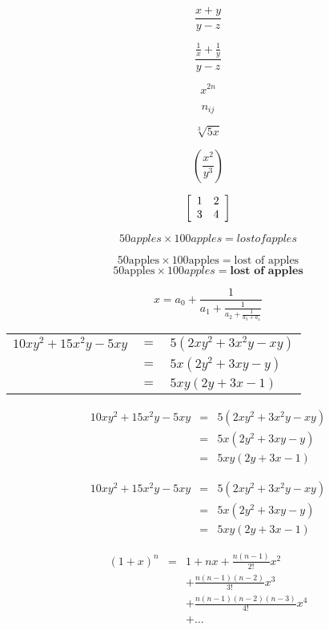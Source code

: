 \documentclass{article}
\begin{document}
 
    $$\frac{x+y}{y-z}$$	

    $$\frac{\frac{1}{x}+\frac{1}{y}}{y-z}$$	

    $$x^{2n}$$

    $$n_{ij}$$

    $$\sqrt[3]{5x}$$

    $$\left(\frac{x^2}{y^3}\right)$$

    $$\left[
    \begin{array}{ c c }
        1 & 2 \\
        3 & 4
    \end{array} 
    \right]$$

    \begin{equation}
        50 apples \times 100 apples = lost of apples
    \end{equation}
    
    \begin{equation}
        50 \mbox{apples} \times 100 \mbox{apples} = \mbox{lost of apples}
    \end{equation}
    \begin{equation}
        50 \textrm{apples} \times 100 \textit{apples} = \textbf{lost of apples}
    \end{equation}
    
    \begin{equation}
        x = a_0 + \frac{1}{\displaystyle a_1 
                + \frac{1}{\displaystyle a_2 
                + \frac{1}{\displaystyle a_3 + a_4}}}
    \end{equation}  
    \begin{tabular}{ r c l }
        \(10xy^2+15x^2y-5xy\) & \(=\) & \(5\left(2xy^2+3x^2y-xy\right)\) \\
        & \(=\) & \(5x\left(2y^2+3xy-y\right)\) \\
        & \(=\) & \(5xy\left(2y+3x-1\right)\)
    \end{tabular}

    \begin{eqnarray}
        10xy^2+15x^2y-5xy & = & 5\left(2xy^2+3x^2y-xy\right) \\
        & = & 5x\left(2y^2+3xy-y\right) \\
        & = & 5xy\left(2y+3x-1\right)
    \end{eqnarray}

    \begin{eqnarray}
        10xy^2+15x^2y-5xy & = & 5\left(2xy^2+3x^2y-xy\right) \nonumber \\
        & = & 5x\left(2y^2+3xy-y\right) \nonumber \\
        & = & 5xy\left(2y+3x-1\right)
    \end{eqnarray}

    \begin{eqnarray*}
        \left(1+x\right)^n & = & 1 + nx + \frac{n\left(n-1\right)}{2!}x^2 \\
        & & + \frac{n\left(n-1\right)\left(n-2\right)}{3!}x^3 \\
        & & + \frac{n\left(n-1\right)\left(n-2\right)\left(n-3\right)}{4!}x^4 \\
        & & + \ldots
    \end{eqnarray*}
\end{document}

